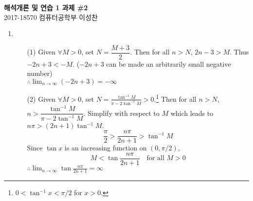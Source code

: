 \documentclass[12pt]{report}
\newcommand{\numl}[1]{\item[\large\textbf{\sffamily #1.}]}
\newcommand{\ds}{\displaystyle}
\begin{document}
\begin{center}
\textbf{\Large 해석개론 및 연습 1 과제 \#2}\\
\large 2017-18570 컴퓨터공학부 이성찬
\end{center}
\begin{enumerate}
\numl{1}
\begin{enumerate}
	\item[(1)] Given $\forall M > 0$, set $N = \dfrac{M + 3}{2}$. Then for all $n>N$, $2n - 3 > M$. Thus $-2n+3 < -M$. ($-2n+3$ can be made an arbitrarily small negative number)\\ $\ds \therefore \lim_{n\rightarrow \infty} (-2n+3) = -\infty$
	\item[(2)] Given $\forall M > 0$, set $\ds N = \frac{\tan^{-1}M}{\pi - 2\tan^{-1}M} > 0$.\footnote{$0 < \tan^{-1}x < \pi/2$ for $x > 0$.} Then for all $n>N$, $n > \dfrac{\tan^{-1}M}{\pi - 2\tan^{-1}M}$. Simplify with respect to $M$ which leads to $n\pi>(2n+1)\tan^{-1}M$. $$\frac{\pi}{2} > \frac{n\pi}{2n+1} > \tan^{-1}M$$Since $\tan x$ is an increasing function on $(0, \pi/2)$, $$M < \tan{\frac{n\pi}{2n+1}} \quad \text{for all } M > 0$$
	$\therefore \ds \lim_{n\rightarrow \infty} \tan\frac{n\pi}{2n+1} = \infty$
\end{enumerate}


\end{enumerate}
\end{document}
